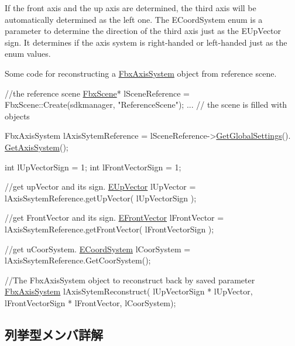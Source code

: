 If the front axis and the up axis are determined, the third axis will be automatically determined as the left one. The E\+Coord\+System enum is a parameter to determine the direction of the third axis just as the E\+Up\+Vector sign. It determines if the axis system is right-\/handed or left-\/handed just as the enum values.

Some code for reconstructing a \hyperlink{class_fbx_axis_system}{Fbx\+Axis\+System} object from reference scene. 
\begin{DoxyCode}
\textcolor{comment}{//the reference scene}
\hyperlink{class_fbx_scene}{FbxScene}* lSceneReference = FbxScene::Create(sdkmanager, \textcolor{stringliteral}{"ReferenceScene"});
...
\textcolor{comment}{// the scene is filled with objects}

FbxAxisSystem lAxisSytemReference = lSceneReference->\hyperlink{class_fbx_scene_a0cb767181a743532c9e9be17f0348570}{GetGlobalSettings}().
      \hyperlink{class_fbx_global_settings_adf26f4742b088b497a5ecec8f458e47d}{GetAxisSystem}();

\textcolor{keywordtype}{int} lUpVectorSign = 1;
\textcolor{keywordtype}{int} lFrontVectorSign = 1;

\textcolor{comment}{//get upVector and its sign.}
\hyperlink{class_fbx_axis_system_ad41a41f7ccd9167f54d09b65ad781d00}{EUpVector} lUpVector = lAxisSsytemReference.getUpVector( lUpVectorSign );

\textcolor{comment}{//get FrontVector and its sign.}
\hyperlink{class_fbx_axis_system_a34bce1daad7ed6ae71916bb825d3ec87}{EFrontVector} lFrontVector = lAxisSsytemReference.getFrontVector( lFrontVectorSign );

\textcolor{comment}{//get uCoorSystem. }
\hyperlink{class_fbx_axis_system_a7cf0485846b560fa34f86932c02ec333}{ECoordSystem} lCoorSystem = lAxisSsytemReference.GetCoorSystem();

\textcolor{comment}{//The FbxAxisSystem object to reconstruct back by saved parameter}
\hyperlink{class_fbx_axis_system}{FbxAxisSystem} lAxisSytemReconstruct( lUpVectorSign * lUpVector, 
                                      lFrontVectorSign * lFrontVector,
                                      lCoorSystem);
\end{DoxyCode}
 

\subsection{列挙型メンバ詳解}
\mbox{\label{class_fbx_axis_system_a7cf0485846b560fa34f86932c02ec333}} 

